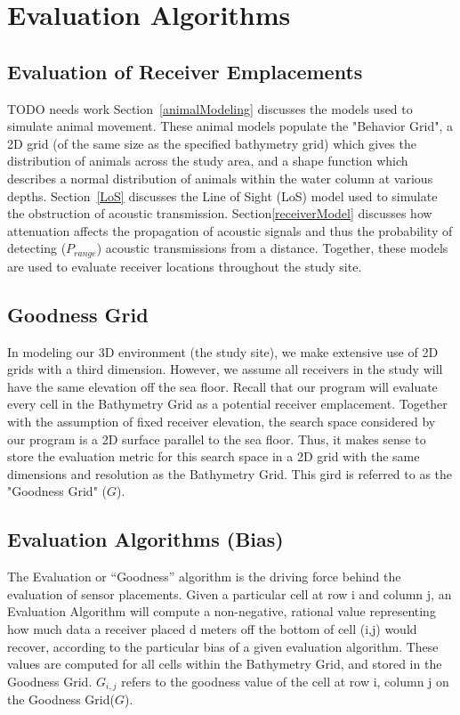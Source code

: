 \section{Evaluation Algorithms}
\label{evaluationAlgorithms}

\subsection{Evaluation of Receiver Emplacements} TODO needs work
\label{evaluationOfReceiver}
Section~\ref{animalModeling} discusses the models used to simulate animal movement.  These animal models populate the "Behavior Grid", a 2D grid (of the same size as the specified bathymetry grid) which gives the distribution of animals across the study area, and a shape function which describes a normal distribution of animals within the water column at various depths.  Section~\ref{LoS} discusses the Line of Sight (LoS) model used to simulate the obstruction of acoustic transmission.  Section\ref{receiverModel} discusses how attenuation affects the propagation of acoustic signals and thus the probability of detecting ($P_{range}$) acoustic transmissions from a distance.  Together, these models are used to evaluate receiver locations throughout the study site.  



\subsection{Goodness Grid}
\label{goodnessGrid}
In modeling our 3D environment (the study site), we make extensive use of 2D grids with a third dimension.  However, we assume all receivers in the study will have the same elevation off the sea floor.  Recall that our program will evaluate every cell in the Bathymetry Grid as a potential receiver emplacement.  Together with the assumption of fixed receiver elevation, the search space considered by our program is a 2D surface parallel to the sea floor.  Thus, it makes sense to store the evaluation metric for this search space in a 2D grid with the same dimensions and resolution as the Bathymetry Grid.  This gird is referred to as the "Goodness Grid" ($G$).  

\subsection{Evaluation Algorithms (Bias)}
The Evaluation or “Goodness” algorithm is the driving force behind the evaluation of sensor placements.  Given a particular cell at row i and column j, an Evaluation Algorithm will compute a non-negative, rational value representing how much data a receiver placed d meters off the bottom of cell (i,j) would recover, according to the particular bias of a given evaluation algorithm.  These values are computed for all cells within the Bathymetry Grid, and stored in the Goodness Grid.  $G_{i,j}$ refers to the goodness value of the cell at row i, column j on the Goodness Grid($G$).  

